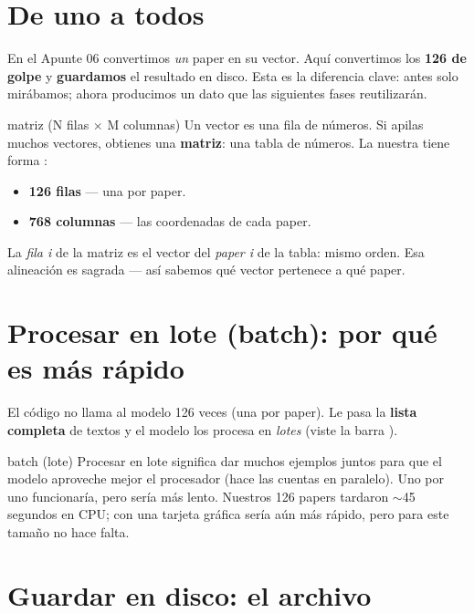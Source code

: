 \documentclass[11pt,a4paper]{article}
\begin{document}

\section{De uno a todos}

En el Apunte 06 convertimos \emph{un} paper en su vector. Aquí convertimos los
\textbf{126 de golpe} y \textbf{guardamos} el resultado en disco. Esta es la diferencia
clave: antes solo mirábamos; ahora producimos un dato que las siguientes fases reutilizarán.

\begin{concepto}{matriz (N filas $\times$ M columnas)}
Un vector es una fila de números. Si apilas muchos vectores, obtienes una \textbf{matriz}:
una tabla de números. La nuestra tiene forma :
\begin{itemize}
  \item \textbf{126 filas} --- una por paper.
  \item \textbf{768 columnas} --- las coordenadas de cada paper.
\end{itemize}
La \emph{fila i} de la matriz es el vector del \emph{paper i} de la tabla: mismo orden. Esa
alineación es sagrada --- así sabemos qué vector pertenece a qué paper.
\end{concepto}

\section{Procesar en lote (batch): por qué es más rápido}

El código no llama al modelo 126 veces (una por paper). Le pasa la \textbf{lista completa}
de textos y el modelo los procesa en \emph{lotes} (viste la barra ).

\begin{concepto}{batch (lote)}
Procesar en lote significa dar muchos ejemplos juntos para que el modelo aproveche mejor el
procesador (hace las cuentas en paralelo). Uno por uno funcionaría, pero sería más lento.
Nuestros 126 papers tardaron $\sim$45 segundos en CPU; con una tarjeta gráfica sería aún
más rápido, pero para este tamaño no hace falta.
\end{concepto}

\section{Guardar en disco: el archivo }
\end{document}
